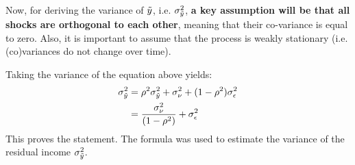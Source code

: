 \documentclass[12pt,a4paper]{article}
\begin{document}
Now, for deriving the variance of $\Tilde{y}$, i.e. $\sigma^2_{\Tilde{y}}$, \textbf{a key assumption will be that all shocks are orthogonal to each other}, meaning that their co-variance is equal to zero. Also, it is important to assume that the process is weakly stationary (i.e. (co)variances do not change over time). 

Taking the variance of the equation above yields:
\begin{align}
    \sigma^2_{\Tilde{y}} & = \rho^2 \sigma^2_{\Tilde{y}} + \sigma^2_\nu + (1-\rho^2)\sigma^2_\epsilon \\
                         & = \frac{\sigma^2_\nu}{(1-\rho^2)} + \sigma^2_\epsilon
\end{align}
This proves the statement. The formula was used to estimate the variance of the residual income $\sigma^2_{\Tilde{y}}$.
\end{document}

